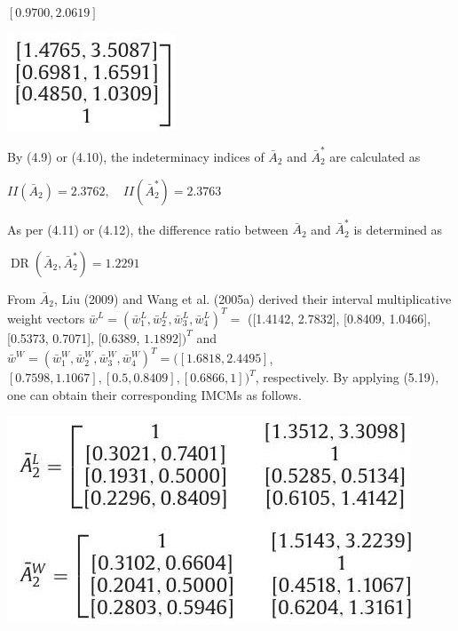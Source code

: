 \documentclass[10pt]{article}
\begin{document}
$[0.9700,2.0619]$

\begin{center}
\includegraphics[max width=\textwidth]{2024_01_11_2cd5b15325412bfb985dg-09(3)}
\end{center}

By (4.9) or (4.10), the indeterminacy indices of $\bar{A}_{2}$ and $\bar{A}_{2}^{*}$ are calculated as

$I I\left(\bar{A}_{2}\right)=2.3762, \quad I I\left(\bar{A}_{2}^{*}\right)=2.3763$

As per (4.11) or (4.12), the difference ratio between $\bar{A}_{2}$ and $\bar{A}_{2}^{*}$ is determined as

$\operatorname{DR}\left(\bar{A}_{2}, \bar{A}_{2}^{*}\right)=1.2291$

From $\bar{A}_{2}$, Liu (2009) and Wang et al. (2005a) derived their interval multiplicative weight vectors $\bar{w}^{L}=\left(\bar{w}_{1}^{L}, \bar{w}_{2}^{L}, \bar{w}_{3}^{L}, \bar{w}_{4}^{L}\right)^{T}=$ ([1.4142, 2.7832], [0.8409, 1.0466], [0.5373, 0.7071], [0.6389, $1.1892])^{T}$ and $\bar{w}^{W}=\left(\bar{w}_{1}^{W}, \bar{w}_{2}^{W}, \bar{w}_{3}^{W}, \bar{w}_{4}^{W}\right)^{T}=([1.6818,2.4495]$, $[0.7598,1.1067],[0.5,0.8409],[0.6866,1])^{T}$, respectively. By applying (5.19), one can obtain their corresponding IMCMs as follows.

\begin{center}
\includegraphics[max width=\textwidth]{2024_01_11_2cd5b15325412bfb985dg-09(1)}
\end{center}
\end{document}
